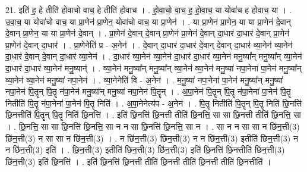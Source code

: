 \documentclass[17pt]{extarticle}
\begin{document}
21. इति॑ ह॒ हे तीति॑ होवाचो वाच॒ हे तीति॑ होवाच । . हो॒वा॒चो॒ वा॒च॒ ह॒ हो॒वा॒च॒ या योवा॑च ह होवाच॒ या । . उ॒वा॒च॒ या योवा॑चो वाच॒ या प्रा॒णेन॑ प्रा॒णेन॒ योवा॑चो वाच॒ या प्रा॒णेन॑ । . या प्रा॒णेन॑ प्रा॒णेन॒ या या प्रा॒णेन॑ दे॒वान् दे॒वान् प्रा॒णेन॒ या या प्रा॒णेन॑ दे॒वान् । . प्रा॒णेन॑ दे॒वान् दे॒वान् प्रा॒णेन॑ प्रा॒णेन॑ दे॒वान् दा॒धार॑ दा॒धार॑ दे॒वान् प्रा॒णेन॑ प्रा॒णेन॑ दे॒वान् दा॒धार॑ । . प्रा॒णेनेति॑ प्र - अ॒नेन॑ । . दे॒वान् दा॒धार॑ दा॒धार॑ दे॒वान् दे॒वान् दा॒धार॑ व्या॒नेन॑ व्या॒नेन॑ दा॒धार॑ दे॒वान् दे॒वान् दा॒धार॑ व्या॒नेन॑ । . दा॒धार॑ व्या॒नेन॑ व्या॒नेन॑ दा॒धार॑ दा॒धार॑ व्या॒नेन॑ मनु॒ष्या᳚न् मनु॒ष्या᳚न् व्या॒नेन॑ दा॒धार॑ दा॒धार॑ व्या॒नेन॑ मनु॒ष्यान्॑ । . व्या॒नेन॑ मनु॒ष्या᳚न् मनु॒ष्या᳚न् व्या॒नेन॑ व्या॒नेन॑ मनु॒ष्या॑ नपा॒नेना॑ पा॒नेन॑ मनु॒ष्या᳚न् व्या॒नेन॑ व्या॒नेन॑ मनु॒ष्या॑ नपा॒नेन॑ । . व्या॒नेनेति॑ वि - अ॒नेन॑ । . म॒नु॒ष्या॑ नपा॒नेना॑ पा॒नेन॑ मनु॒ष्या᳚न् मनु॒ष्या॑ नपा॒नेन॑ पि॒तॄन् पि॒तॄ न॑पा॒नेन॑ मनु॒ष्या᳚न् मनु॒ष्या॑ नपा॒नेन॑ पि॒तॄन् । . अ॒पा॒नेन॑ पि॒तॄन् पि॒तॄ न॑पा॒नेना॑ पा॒नेन॑ पि॒तॄ नितीति॑ पि॒तॄ न॑पा॒नेना॑ पा॒नेन॑ पि॒तॄ निति॑ । . अ॒पा॒नेनेत्य॑प - अ॒नेन॑ । . पि॒तॄ नितीति॑ पि॒तॄन् पि॒तॄ निति॑ छि॒नत्ति॑ छि॒नत्तीति॑ पि॒तॄन् पि॒तॄ निति॑ छि॒नत्ति॑ । . इति॑ छि॒नत्ति॑ छि॒नत्ती तीति॑ छि॒नत्ति॒ सा सा छि॒नत्ती तीति॑ छि॒नत्ति॒ सा । . छि॒नत्ति॒ सा सा छि॒नत्ति॑ छि॒नत्ति॒ सा न न सा छि॒नत्ति॑ छि॒नत्ति॒ सा न । . सा न न सा सा न छि॑न॒त्ती(3) छि॑न॒त्ती(3) न सा सा न छि॑न॒त्ती(3) । . न छि॑न॒त्ती(3) छि॑न॒त्ती(3) न न छि॑न॒त्ती(3) इतीति॑ छिन॒त्ती(3) न न छि॑न॒त्ती(3) इति॑ । . छि॒न॒त्ती(3) इतीति॑ छिन॒त्ती(3) छि॑न॒त्ती(3) इति॑ छि॒नत्ति॑ छि॒नत्तीति॑ छिन॒त्ती(3) छि॑न॒त्ती(3) इति॑ छि॒नत्ति॑ । . इति॑ छि॒नत्ति॑ छि॒नत्ती तीति॑ छि॒नत्ती तीति॑ छि॒नत्ती तीति॑ छि॒नत्तीति॑ । \newline
\end{document}
